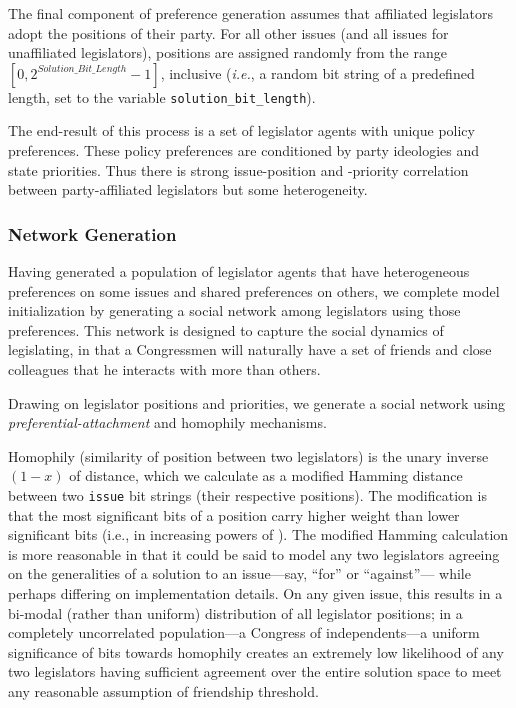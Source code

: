 \documentclass[pdftex,12pt]{llncs}
\begin{document}
The final component of preference generation assumes that affiliated legislators adopt the positions of their party.  For all other issues (and all issues for unaffiliated legislators), positions are assigned randomly from the range $[0, 2^{Solution\_Bit\_Length} - 1]$, inclusive (\textit{i.e.}, a random bit string of a predefined length, set to the variable \texttt{solution\_bit\_length}).  

The end-result of this process is a set of legislator agents with unique policy preferences.  These policy preferences are conditioned by party ideologies and state priorities.  Thus there is strong issue-position and -priority correlation between party-affiliated legislators but some heterogeneity.

\subsubsection{Network Generation}
Having generated a population of legislator agents that have heterogeneous preferences on some issues and shared preferences on others, we complete model initialization by generating a social network among legislators using those preferences.
This network is designed to capture the social dynamics of legislating, in that a Congressmen will naturally have a set of friends and close colleagues that he interacts with more than others.

Drawing on legislator positions and priorities, we generate a social network using \textit{preferential-attachment} and homophily mechanisms.

Homophily (similarity of position between two legislators) is the unary inverse $(1 - x)$ of distance, which we calculate as a modified Hamming distance between two \texttt{issue} bit strings (their respective positions).  The modification is that the most significant bits of a position carry higher weight than lower significant bits (i.e., in increasing powers of ).  The modified Hamming calculation is more reasonable in that it could be said to model any two legislators agreeing on the generalities of a solution to an issue---say, ``for'' or ``against''--- while perhaps differing on implementation details.  On any given issue, this results in a bi-modal (rather than uniform) distribution of all legislator positions; in a completely uncorrelated population---a Congress of independents---a uniform significance of bits towards homophily creates an extremely low likelihood of any two legislators having sufficient agreement over the entire solution space to meet any reasonable assumption of friendship threshold.
\end{document}
